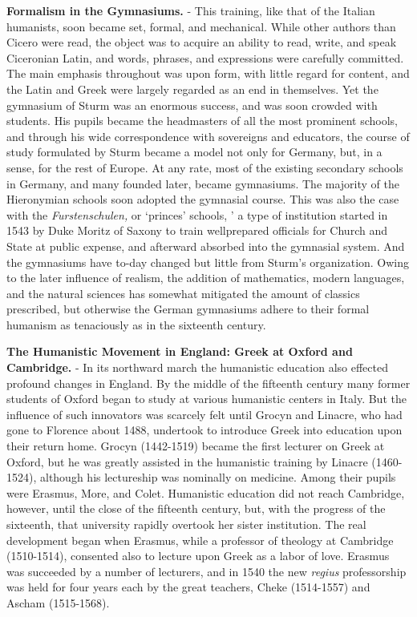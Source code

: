 \documentclass[
]{book}
\begin{document}
\textbf{Formalism in the Gymnasiums.} - This training, like that of the Italian humanists, soon became set, formal, and mechanical. While other authors than Cicero were read, the object was to acquire an ability to read, write, and speak Ciceronian Latin, and words, phrases, and expressions were carefully committed. The main emphasis throughout was upon form, with little regard for content, and the Latin and Greek were largely regarded as an end in themselves. Yet the gymnasium of Sturm was an enormous success, and was soon crowded with students. His pupils became the headmasters of all the most prominent schools, and through his wide correspondence with sovereigns and educators, the course of study formulated by Sturm became a model not only for Germany, but, in a sense, for the rest of Europe. At any rate, most of the existing secondary schools in Germany, and many founded later, became gymnasiums. The majority of the Hieronymian schools soon adopted the gymnasial course. This was also the case with the \emph{Furstenschulen,} or `princes' schools, ' a type of institution started in 1543 by Duke Moritz of Saxony to train wellprepared officials for Church and State at public expense, and afterward absorbed into the gymnasial system. And the gymnasiums have to-day changed but little from Sturm's organization. Owing to the later influence of realism, the addition of mathematics, modern languages, and the natural sciences has somewhat mitigated the amount of classics prescribed, but otherwise the German gymnasiums adhere to their formal humanism as tenaciously as in the sixteenth century.

\textbf{The Humanistic Movement in England: Greek at Oxford and Cambridge.} - In its northward march the humanistic education also effected profound changes in England. By the middle of the fifteenth century many former students of Oxford began to study at various humanistic centers in Italy. But the influence of such innovators was scarcely felt until Grocyn and Linacre, who had gone to Florence about 1488, undertook to introduce Greek into education upon their return home. Grocyn (1442-1519) became the first lecturer on Greek at Oxford, but he was greatly assisted in the humanistic training by Linacre (1460-1524), although his lectureship was nominally on medicine. Among their pupils were Erasmus, More, and Colet. Humanistic education did not reach Cambridge, however, until the close of the fifteenth century, but, with the progress of the sixteenth, that university rapidly overtook her sister institution. The real development began when Erasmus, while a professor of theology at Cambridge (1510-1514), consented also to lecture upon Greek as a labor of love. Erasmus was succeeded by a number of lecturers, and in 1540 the new \emph{regius} professorship was held for four years each by the great teachers, Cheke (1514-1557) and Ascham (1515-1568).
\end{document}

